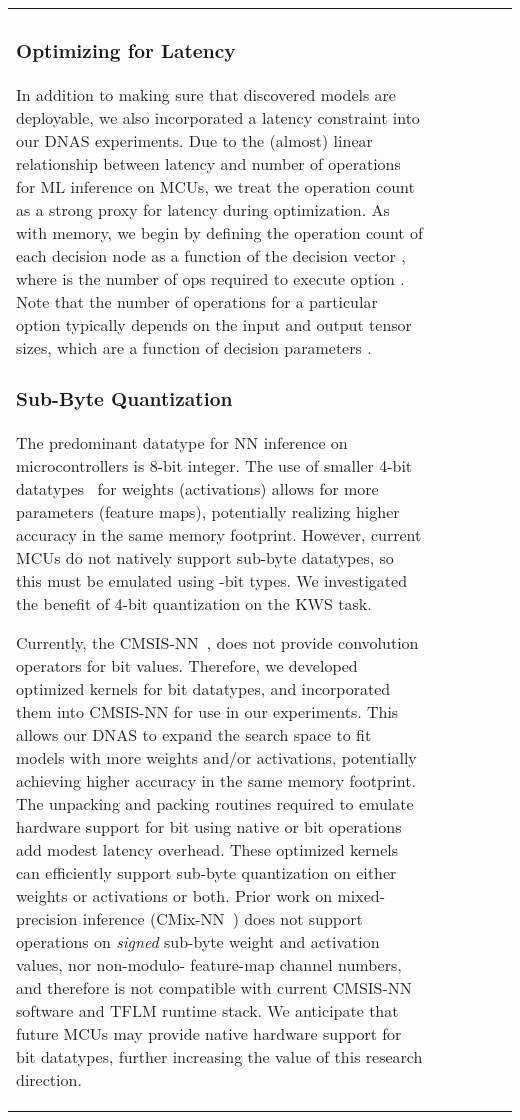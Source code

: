 \documentclass{article}
\begin{document}
\begin{table}[t]
\begin{tabular}{l| c | c | c | c | c}
\subsubsection{Optimizing for Latency}
In addition to making sure that discovered models are deployable, we also incorporated a latency constraint into our DNAS experiments. Due to the (almost) linear relationship between latency and number of operations for ML inference on MCUs, we treat the operation count as a strong proxy for latency during optimization. As with memory, we begin by defining the operation count of each decision node as a function of the decision vector , where  is the number of ops required to execute option . Note that the number of operations for a particular option typically depends on the input and output tensor sizes, which are a function of decision parameters  \cite{Wan_2020_CVPR}.


\subsubsection{Sub-Byte Quantization}

The predominant datatype for NN inference on microcontrollers is 8-bit integer.
The use of smaller 4-bit datatypes~\cite{LSQuantization_ICLR2020,PROFIT_ECCV2020,thakker2021mlsys,annie1} for weights (activations) allows for more parameters (feature maps), potentially realizing higher accuracy in the same memory footprint.
However, current MCUs do not natively support sub-byte datatypes, so this must be emulated using -bit types.
We investigated the benefit of 4-bit quantization on the KWS task.




Currently, the CMSIS-NN~\cite{lai2018cmsis}, does not provide convolution operators for bit values. 
Therefore, we developed optimized kernels for bit datatypes, and incorporated them into CMSIS-NN for use in our experiments.
This allows our DNAS to expand the search space to fit models with more weights and/or activations, potentially achieving higher accuracy in the same memory footprint.
The unpacking and packing routines required to emulate hardware support for bit using native  or bit operations add modest latency overhead.
These optimized kernels can efficiently support sub-byte quantization on either weights or activations or both. 
Prior work on mixed-precision inference (CMix-NN~\cite{capotondi2020cmix}) does not support operations on \textit{signed} sub-byte weight and activation values, nor non-modulo- feature-map channel numbers, and therefore is not compatible 
with current CMSIS-NN software and TFLM runtime stack.
We anticipate that future MCUs may provide native hardware support for bit datatypes, further increasing the value of this research direction.



\end{tabular}
\end{table}
\end{document}
